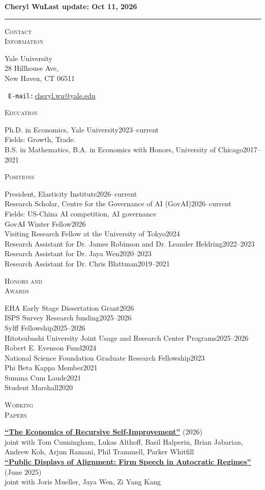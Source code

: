 \documentclass[10pt]{article}
\newlength{\labelcol}\setlength{\labelcol}{1.15in}
\newlength{\contentcol}\setlength{\contentcol}{\dimexpr\textwidth-\labelcol-0.15in\relax}
\newcommand{\cvsection}[2]{%
  \par\vspace{10pt}%
  \begin{minipage}[t]{\labelcol}\textsc{#1}\end{minipage}\hfill
  \begin{minipage}[t]{\contentcol}#2\end{minipage}\par}
\newcommand{\entry}[2]{#1\hfill #2\\}
\newcommand{\paper}[1]{\textbf{#1}}
\begin{document}
{\Large\textbf{Cheryl Wu}}\hfill\textbf{Last update: Oct 11, 2026}\\[2pt]
\rule{\textwidth}{0.8pt}

\cvsection{Contact\\Information}{%
  \begin{minipage}[t]{2.8in}
    Yale University\\
    28 Hillhouse Ave,\\
    New Haven, CT 06511
  \end{minipage}\hfill
  \begin{minipage}[t]{2.6in}
    \raggedleft\Letter\ \texttt{E-mail:}\,\href{mailto:cheryl.wu@yale.edu}{cheryl.wu@yale.edu}
  \end{minipage}}

\cvsection{Education}{%
  \entry{Ph.D. in Economics, Yale University}{2023--current}
  Fields: Growth, Trade.\\
  \entry{B.S. in Mathematics, B.A. in Economics with Honors, University of Chicago}{2017--2021}}

\cvsection{Positions}{%
  \entry{President, Elasticity Institute}{2026--current}
  \entry{Research Scholar, Centre for the Governance of AI (GovAI)}{2026--current}
  Fields: US-China AI competition, AI governance\\
  \entry{GovAI Winter Fellow}{2026}
  \entry{Visiting Research Fellow at the University of Tokyo}{2024}
  \entry{Research Assistant for Dr. James Robinson and Dr. Leander Heldring}{2022--2023}
  \entry{Research Assistant for Dr. Jaya Wen}{2020--2023}
  \entry{Research Assistant for Dr. Chris Blattman}{2019--2021}}

\cvsection{Honors and\\Awards}{%
  \entry{EHA Early Stage Dissertation Grant}{2026}
  \entry{ISPS Survey Research funding}{2025--2026}
  \entry{Sylff Fellowship}{2025--2026}
  \entry{Hitotsubashi University Joint Usage and Research Center Programs}{2025--2026}
  \entry{Robert E. Evenson Fund}{2024}
  \entry{National Science Foundation Graduate Research Fellowship}{2023}
  \entry{Phi Beta Kappa Member}{2021}
  \entry{Summa Cum Laude}{2021}
  \entry{Student Marshall}{2020}}

\cvsection{Working\\Papers}{%
  \paper{\href{https://elasticity.institute/rsi-paper.pdf}{``The Economics of Recursive Self-Improvement''}} (2026)\\
  joint with Tom Cunningham, Lukas Althoff, Basil Halperin, Brian Jabarian, Andrew Koh, Arjun Ramani, Phil Trammell, Parker Whitfill\\
  \paper{\href{https://drive.google.com/file/d/1IECgWxJP0zuQwfA5LNLCeetzpyEJrngi/view}{``Public Displays of Alignment: Firm Speech in Autocratic Regimes''}} (June 2025)\\
  joint with Joris Mueller, Jaya Wen, Zi Yang Kang}
\end{document}
